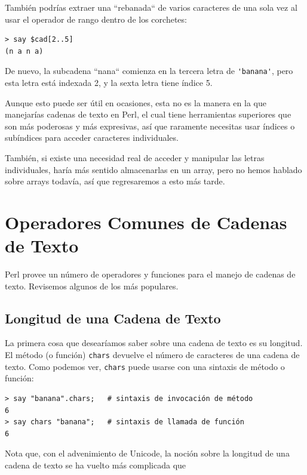 También podrías extraer una ``rebanada`` de varios caracteres
de una sola vez al usar el operador de rango dentro de los 
corchetes:

\begin{verbatim}
> say $cad[2..5]
(n a n a)
\end{verbatim}
%
De nuevo, la subcadena ``nana`` comienza en la tercera letra
de \verb|'banana'|, pero esta letra está indexada 2, y la
sexta letra tiene índice 5.

Aunque esto puede ser útil en ocasiones, esta no es la manera
en la que manejarías cadenas de texto en Perl, el cual tiene
herramientas superiores que son más poderosas y más 
expresivas, así que raramente necesitas usar índices o 
subíndices para acceder caracteres individuales.

También, si existe una necesidad real de acceder y manipular
las letras individuales, haría más sentido almacenarlas en un 
array, pero no hemos hablado sobre arrays todavía, así que
regresaremos a esto más tarde.

\section{Operadores Comunes de Cadenas de Texto}

Perl provee un número de operadores y funciones para el 
manejo de cadenas de texto. Revisemos algunos de los más 
populares.

\subsection{Longitud de una Cadena de Texto}

La primera cosa que desearíamos saber sobre una cadena de texto 
es su longitud. El método (o función) {\tt chars} devuelve el número de
caracteres de una cadena de texto. Como podemos ver, {\tt chars} puede
usarse con una sintaxis de método o función:

\begin{verbatim}
> say "banana".chars;   # sintaxis de invocación de método
6
> say chars "banana";   # sintaxis de llamada de función
6
\end{verbatim}
%

Nota que, con el advenimiento de Unicode, la noción 
sobre la longitud de una cadena de texto se ha vuelto 
más complicada que 

